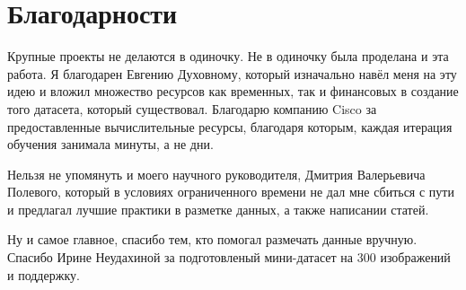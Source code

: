 \section*{Благодарности}

Крупные проекты не делаются в одиночку. Не в одиночку была проделана и эта работа. Я благодарен Евгению Духовному, который изначально навёл меня на эту идею и вложил множество ресурсов как временных, так и финансовых в создание того датасета, который существовал. Благодарю компанию Cisco за предоставленные вычислительные ресурсы, благодаря которым, каждая итерация обучения занимала минуты, а не дни. 

Нельзя не упомянуть и моего научного руководителя, Дмитрия Валерьевича Полевого, который в условиях ограниченного времени не дал мне сбиться с пути и предлагал лучшие практики в разметке данных, а также написании статей.

Ну и самое главное, спасибо тем, кто помогал размечать данные вручную. Спасибо Ирине Неудахиной за подготовленый мини-датасет на 300 изображений и поддержку.